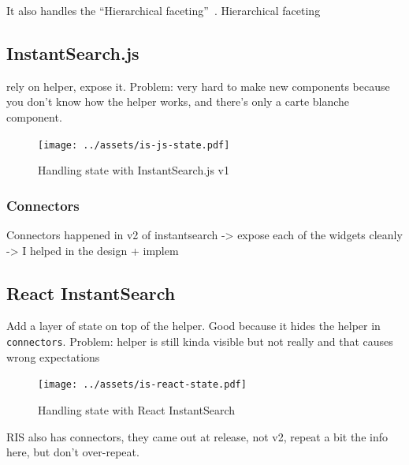 It also handles the ``Hierarchical faceting''\cite{hierarchical-faceting}~. Hierarchical faceting %


\subsection{InstantSearch.js} %
\label{sub:instantsearch_js}

rely on helper, expose it. Problem: very hard to make new components because you don't know how the helper works, and there's only a carte blanche component. %

\begin{figure}[H]
\label{figure:is-js-state}
  \centering
  \texttt{[image: ../assets/is-js-state.pdf]}
  \caption{Handling state with InstantSearch.js v1}
\end{figure}

\subsubsection{Connectors} %
\label{ssub:instantsearch_js_connectors}

Connectors happened in v2 of instantsearch
-> expose each of the widgets cleanly
-> I helped in the design + implem %



\subsection{React InstantSearch} %
\label{sub:react_instantearch}

Add a layer of state on top of the helper. Good because it hides the helper in {\tt connectors}. Problem: helper is still kinda visible but not really and that causes wrong expectations %

\begin{figure}[H]
\label{figure:is-react-state}
  \centering
  \texttt{[image: ../assets/is-react-state.pdf]}
  \caption{Handling state with React InstantSearch}
\end{figure}

RIS also has connectors, they came out at release, not v2, repeat a bit the info here, but don't over-repeat. %


